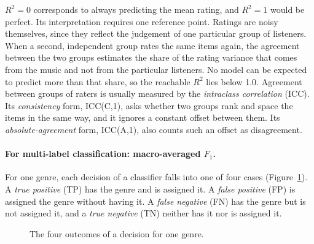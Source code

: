 \noindent $R^2 = 0$ corresponds to always predicting the mean rating, and $R^2 = 1$ would be perfect. Its interpretation requires one reference point. Ratings are noisy themselves, since they reflect the judgement of one particular group of listeners. When a second, independent group rates the same items again, the agreement between the two groups estimates the share of the rating variance that comes from the music and not from the particular listeners. No model can be expected to predict more than that share, so the reachable $R^2$ lies below 1.0. Agreement between groups of raters is usually measured by the \emph{intraclass correlation} (ICC). Its \emph{consistency} form, ICC(C,1), asks whether two groups rank and space the items in the same way, and it ignores a constant offset between them. Its \emph{absolute-agreement} form, ICC(A,1), also counts such an offset as disagreement.

\paragraph{For multi-label classification: macro-averaged $F_1$.} For one genre, each decision of a classifier falls into one of four cases (Figure~\ref{fig:confusion}). A \emph{true positive} (TP) has the genre and is assigned it. A \emph{false positive} (FP) is assigned the genre without having it. A \emph{false negative} (FN) has the genre but is not assigned it, and a \emph{true negative} (TN) neither has it nor is assigned it.

\begin{figure}[H]
  \centering
  \caption{The four outcomes of a decision for one genre.}
  \label{fig:confusion}
\end{figure}

